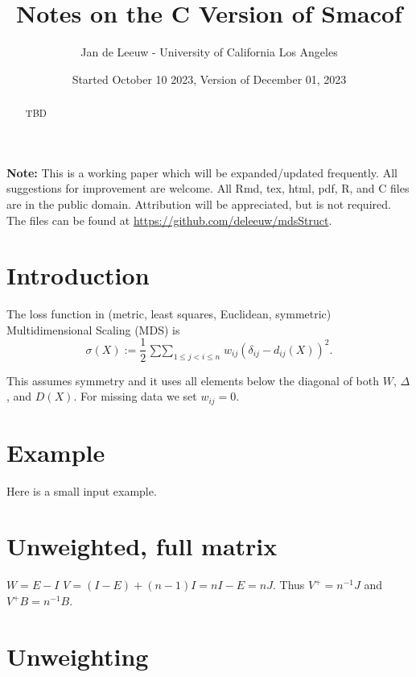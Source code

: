\documentclass[
  12pt,
]{article}
\title{Notes on the C Version of Smacof}
\author{Jan de Leeuw - University of California Los Angeles}
\date{Started October 10 2023, Version of December 01, 2023}
\newcommand{\jis}{\mathop{\sum\sum}_{1\leq j<i\leq n}}
\begin{document}
\maketitle
\begin{abstract}
TBD
\end{abstract}

{
\setcounter{tocdepth}{4}
\tableofcontents
}
\textbf{Note:} This is a working paper which will be expanded/updated frequently. All suggestions for improvement are welcome. All Rmd, tex, html, pdf, R, and C files are in the public domain. Attribution
will be appreciated, but is not required. The files can be found at
\url{https://github.com/deleeuw/mdsStruct}.

\section{Introduction}\label{introduction}

The loss function in (metric, least squares, Euclidean, symmetric) Multidimensional Scaling (MDS)
is
\[
\sigma(X):=\frac12\jis w_{ij}(\delta_{ij}-d_{ij}(X))^2.
\]

This assumes symmetry and it uses all elements below the diagonal of both \(W\), \(\Delta\), and \(D(X)\).
For missing data we set \(w_{ij}=0\).

\section{Example}\label{example}

Here is a small input example.

\section{Unweighted, full matrix}\label{unweighted-full-matrix}

\(W=E-I\) \(V=(I-E)+(n-1)I=nI-E=nJ\). Thus \(V^+=n^{-1}J\) and \(V^+B=n^{-1}B\).

\section{Unweighting}\label{unweighting}

\end{document}

